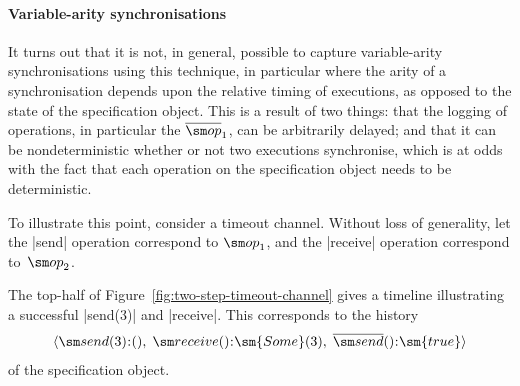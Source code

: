 
\paragraph{Variable-arity synchronisations}

It turns out that it is not, in general, possible to capture variable-arity
synchronisations using this technique, in particular where the arity of a
synchronisation depends upon the relative timing of executions, as opposed to
the state of the specification object.  This is a result of two things: that
the logging of operations, in particular the $\overline{\op}_1$, can be
arbitrarily delayed; and that it can be nondeterministic whether or not two
executions synchronise, which is at odds with the fact that each operation on
the specification object needs to be deterministic.

To illustrate this point, consider a timeout channel.  Without loss of
generality, let the |send| operation correspond to $\op_1$, and the
|receive| operation correspond to~$\op_2$.

The top-half of Figure~\ref{fig:two-step-timeout-channel} gives a
timeline illustrating a successful |send(3)| and |receive|.  This
corresponds to the history
\[
\seq{ \send(3)\::(),\; \receive()\::\sm{Some}(3),\; 
  \overline{\send}()\::\sm{true} }
\]
of the specification object.



